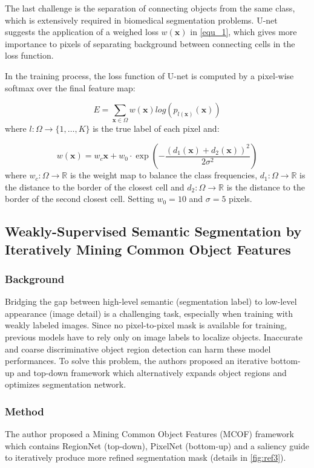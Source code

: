 \documentclass{article}
\begin{document}
The last challenge is the separation of connecting objects from the same class, which is extensively required in biomedical segmentation problems. U-net suggests the application of a weighed loss $w(\bm{x})$ in \ref{equ_1}, which gives more importance to pixels of separating background between connecting cells in the loss function.

In the training process, the loss function of U-net is computed by a pixel-wise softmax  over the final feature map:

\begin{equation}
E = \sum_{\bm{x} \in \Omega} w(\bm{x})log(p_{l(\bm{x})}(\bm{x}))
\label{equ_1}
\end{equation}
where $l: \Omega \to \{1, \dots, K\}$ is the true label of each pixel and:

\begin{equation}
w(\bm{x}) = w_c{\bm{x}} + w_0 \cdot \exp ( - \frac{(d_1(\bm{x}) + d_2(\bm{x}))^2}{2 \sigma ^2})
\end{equation}
where $w_c : \Omega \to \mathbb{R}$ is the weight map to balance the class frequencies, $d_1 : \Omega \to \mathbb{R}$ is the distance to the border of the closest cell and $d_2 : \Omega \to \mathbb{R}$ is the distance to the border of the second closest cell. Setting $w_0 = 10$ and $\sigma = 5$ pixels.

\subsection{Weakly-Supervised Semantic Segmentation by Iteratively Mining Common Object Features \cite{Wang2018WeaklySupervisedSS}}

\subsubsection{Background}
Bridging the gap between high-level semantic (segmentation label) to low-level appearance (image detail) is a challenging task, especially when training with weakly labeled images. Since no pixel-to-pixel mask is available for training, previous models have to rely only on image labels to localize objects. Inaccurate and coarse discriminative object region detection can harm these model performances. To solve this problem, the authors proposed an iterative bottom-up and top-down framework which alternatively expands object regions and optimizes segmentation network. 

\subsubsection{Method}
The author proposed a Mining Common Object Features (MCOF) framework which contains RegionNet (top-down), PixelNet (bottom-up) and a saliency guide to iteratively produce more refined segmentation mask (details in \ref{fig:ref3}).
\end{document}
